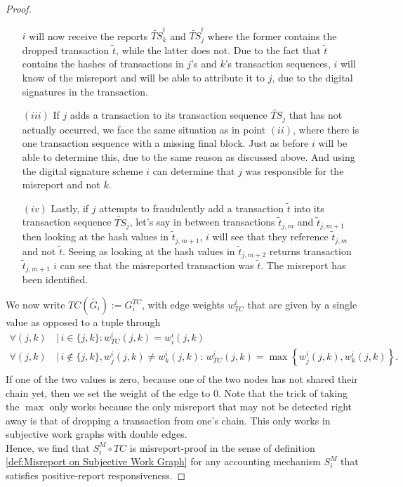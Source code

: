 \begin{proof}
\begin{itemize}
\noindent{}$i$ will now receive the reports $\tilde{TS}_k^i$ and $\tilde{TS}_j^i$ where the former contains the dropped transaction $\tilde{t}$, while the latter does not. Due to the fact that $\tilde{t}$ contains the hashes of transactions in $j$'s and $k$'s transaction sequences, $i$ will know of the misreport and will be able to attribute it to $j$, due to the digital signatures in the transaction. \vspace{1em}\\

\item[$(iii)$]If $j$ adds a transaction to its transaction sequence $\tilde{TS}_j$ that has not actually occurred, we face the same situation as in point $(ii)$, where there is one transaction sequence with a missing final block. Just as before $i$ will be able to determine this, due to the same reason as discussed above. And using the digital signature scheme $i$ can determine that $j$ was responsible for the misreport and not $k$. \vspace{1em}\\

\item[$(iv)$]Lastly, if $j$ attempts to fraudulently add a transaction $\tilde{t}$ into its transaction sequence $\tilde{TS}_j$, let's say in between transactions $\tilde{t}_{j,m}$ and $\tilde{t}_{j,m+1}$ then looking at the hash values in $\tilde{t}_{j,m+1}$, $i$ will see that they reference $\tilde{t}_{j,m}$ and not $\tilde{t}$. Seeing as looking at the hash values in $\tilde{t}_{j,m+2}$ returns transaction $\tilde{t}_{j,m+1}$ $i$ can see that the misreported transaction was $\tilde{t}$. The misreport has been identified.\vspace{1em}\\ 
\end{itemize}

\noindent{}We now write $TC(\tilde{G_i}):=G_i^{TC}$, with edge weights $w_{TC}^i$ that are given by a single value as opposed to a tuple through
\begin{align*}
\forall{}(j,k)&\,|\,i\in\lbrace{}j,k\rbrace{}: w^i_{TC}(j,k)=w_i^i(j,k) \\
\forall{}(j,k)&\,|\,i\not\in\lbrace{}j,k\rbrace{},w^i_j(j,k)\neq{}w^i_k(j,k):\, w^i_{TC}(j,k)=\max\left\lbrace w^i_j(j,k), w^i_k(j,k)\right\rbrace . \\
\end{align*}
\noindent{}If one of the two values is zero, because one of the two nodes has not shared their chain yet, then we set the weight of the edge to $0$. Note that the trick of taking the $\max$ only works because the only misreport that may not be detected right away is that of dropping a transaction from one's chain. This only works in subjective work graphs with double edges.\vspace{1em}\\

\noindent{}Hence, we find that $S^M_i\circ{}TC$ is misreport-proof in the sense of definition \ref{def:Misreport on Subjective Work Graph} for any accounting mechanism $S^M_i$ that satisfies positive-report responsiveness.
\end{proof}

